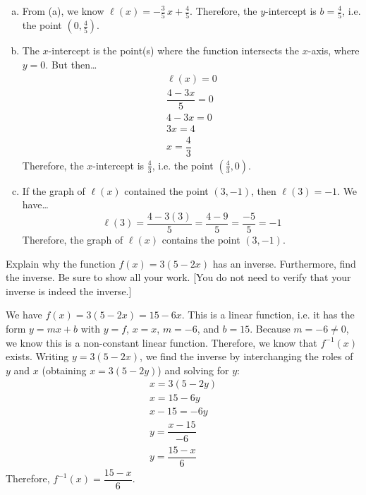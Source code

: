 \documentclass[12pt,letterpaper]{exam}
\begin{document}
\begin{questions}
\begin{enumerate}[(a)]
\item From (a), we know $\ell(x)= -\frac{3}{5}\,x + \frac{4}{5}$. Therefore, the $y$-intercept is $b= \frac{4}{5}$, i.e. the point $(0, \frac{4}{5})$. \pspace

\item The $x$-intercept is the point(s) where the function intersects the $x$-axis, where $y= 0$. But then\dots
	\[
	\begin{gathered}
	\ell(x)= 0 \\
	\dfrac{4 - 3x}{5}= 0 \\
	4 - 3x= 0 \\
	3x= 4 \\
	x= \dfrac{4}{3}
	\end{gathered}
	\]
Therefore, the $x$-intercept is $\frac{4}{3}$, i.e. the point $(\frac{4}{3}, 0)$. \pspace

\item If the graph of $\ell(x)$ contained the point $(3, -1)$, then $\ell(3)= -1$. We have\dots
	\[
	\ell(3)= \dfrac{4 - 3(3)}{5}= \dfrac{4 - 9}{5}= \dfrac{-5}{5}= -1
	\]
Therefore, the graph of $\ell(x)$ contains the point $(3, -1)$. 
\end{enumerate}



\newpage
\question[10] Explain why the function $f(x)= 3(5 - 2x)$ has an inverse. Furthermore, find the inverse. Be sure to show all your work. [You do not need to verify that your inverse is indeed the inverse.] \pspace

\sol We have $f(x)= 3(5 - 2x)= 15 - 6x$. This is a linear function, i.e. it has the form $y= mx + b$ with $y= f$, $x= x$, $m= -6$, and $b= 15$. Because $m= -6 \neq 0$, we know this is a non-constant linear function. Therefore, we know that $f^{-1}(x)$ exists. Writing $y= 3(5 - 2x)$, we find the inverse by interchanging the roles of $y$ and $x$ (obtaining $x= 3(5 - 2y)$) and solving for $y$:
	\[
	\begin{gathered}
	x= 3(5 - 2y) \\
	x= 15 - 6y \\
	x - 15= -6y \\
	y= \dfrac{x - 15}{-6} \\
	y= \dfrac{15 - x}{6}
	\end{gathered}
	\]
Therefore, $f^{-1}(x)= \dfrac{15 - x}{6}$. \pspace


\end{questions}
\end{document}
